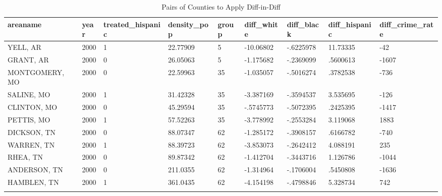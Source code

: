 \documentclass{article}
\begin{document}
\begin{table}[tbp] \centering%
\caption{Pairs of Counties to Apply Diff-in-Diff}%
\begin{tabularx}{\textwidth}{lCCCCCCCC}
\toprule
areaname&year&treated\_hispanic&density\_pop&group&diff\_white&diff\_black&diff\_hispanic&diff\_crime\_rate \tabularnewline
\midrule\addlinespace[1.5ex]
YELL, AR&2000&1&22.77909&5&-10.06802&-.6225978&11.73335&-42 \tabularnewline
GRANT, AR&2000&0&26.05063&5&-1.175682&-.2369099&.5600613&-1607 \tabularnewline
MONTGOMERY, MO&2000&0&22.59963&35&-1.035057&-.5016274&.3782538&-736 \tabularnewline
SALINE, MO&2000&1&31.42328&35&-3.387169&-.3594537&3.535695&-126 \tabularnewline
CLINTON, MO&2000&0&45.29594&35&-.5745773&-.5072395&.2425395&-1417 \tabularnewline
PETTIS, MO&2000&1&57.52263&35&-3.778992&-.2553284&3.119068&1883 \tabularnewline
DICKSON, TN&2000&0&88.07347&62&-1.285172&-.3908157&.6166782&-740 \tabularnewline
WARREN, TN&2000&1&88.39723&62&-3.853073&-.2642412&4.088191&235 \tabularnewline
RHEA, TN&2000&0&89.87342&62&-1.412704&-.3443716&1.126786&-1044 \tabularnewline
ANDERSON, TN&2000&0&211.0355&62&-1.314964&-.1706004&.5450808&-1636 \tabularnewline
HAMBLEN, TN&2000&1&361.0435&62&-4.154198&-.4798846&5.328734&742 \tabularnewline
\bottomrule \addlinespace[1.5ex]
\end{tabularx}%
\end{table}%
\end{document}
